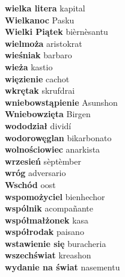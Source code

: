 \textbf{ wielka litera  } kapital \\
\textbf{ Wielkanoc  } Pasku \\
\textbf{ Wielki Piątek  } bièrnèsantu \\
\textbf{ wielmoża  } aristokrat \\
\textbf{ wieśniak  } barbaro \\
\textbf{ wieża  } kastio \\
\textbf{ więzienie  } cachot \\
\textbf{ wkrętak  } skrufdrai \\
\textbf{ wniebowstąpienie  } Asunshon \\
\textbf{ Wniebowzięta  } Birgen \\
\textbf{ wododział  } dividí \\
\textbf{ wodorowęglan  } bikarbonato \\
\textbf{ wolnościowiec  } anarkista \\
\textbf{ wrzesień  } sèptèmber \\
\textbf{ wróg  } adversario \\
\textbf{ Wschód  } oost \\
\textbf{ wspomożyciel  } bienhechor \\
\textbf{ wspólnik  } acompañante \\
\textbf{ współmałżonek  } kasa \\
\textbf{ współrodak  } paisano \\
\textbf{ wstawienie się  } buracheria \\
\textbf{ wszechświat  } kreashon \\
\textbf{ wydanie na świat  } nasementu \\
